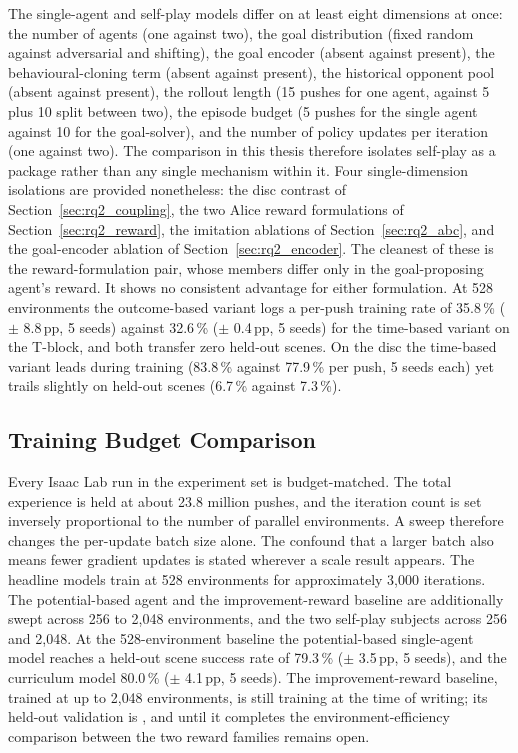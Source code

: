 The single-agent and self-play models differ on at least eight dimensions at once:
the number of agents (one against two), the goal distribution (fixed random
against adversarial and shifting), the goal encoder (absent against present), the
behavioural-cloning term (absent against present), the historical opponent pool
(absent against present), the rollout length (15 pushes for one agent, against
5 plus 10 split between two), the episode budget (5 pushes for the single agent
against 10 for the goal-solver), and the number of policy updates per iteration
(one
against two). The comparison in this thesis therefore isolates self-play as a
package rather than any single mechanism within it. Four single-dimension
isolations are provided nonetheless: the disc contrast of
Section~\ref{sec:rq2_coupling}, the two Alice reward formulations of
Section~\ref{sec:rq2_reward}, the imitation ablations of
Section~\ref{sec:rq2_abc}, and the goal-encoder ablation of
Section~\ref{sec:rq2_encoder}. The cleanest of these is the reward-formulation
pair, whose members differ only in the goal-proposing agent's reward. It shows no
consistent advantage for either formulation. At 528 environments the
outcome-based variant logs a per-push training rate of 35.8\,\%
($\pm$ 8.8\,pp, 5 seeds) against 32.6\,\% ($\pm$ 0.4\,pp, 5 seeds) for the
time-based variant on the T-block, and both transfer zero held-out scenes. On the
disc the time-based variant leads during training (83.8\,\% against 77.9\,\%
per push,
5 seeds each) yet trails slightly on held-out scenes (6.7\,\% against
7.3\,\%).

\subsection{Training Budget Comparison}
\label{app:budget}

Every Isaac Lab run in the experiment set is budget-matched. The total experience
is held at about 23.8 million pushes, and the iteration count is set inversely
proportional to the number of parallel environments. A sweep therefore changes
the per-update batch size alone. The confound that a larger batch also means
fewer gradient updates is stated wherever a scale result appears. The headline
models
train at 528 environments for approximately 3{,}000 iterations. The
potential-based agent and the improvement-reward baseline are additionally swept
across 256 to 2{,}048 environments, and the two self-play subjects across 256 and
2{,}048. At the 528-environment baseline the potential-based single-agent model
reaches a held-out scene success rate of 79.3\,\% ($\pm$ 3.5\,pp, 5 seeds), and
the curriculum model 80.0\,\% ($\pm$ 4.1\,pp, 5 seeds). The improvement-reward
baseline, trained at up to 2{,}048 environments, is still training at the time
of writing; its held-out validation is \TBD, and until it completes the
environment-efficiency comparison between the two reward families remains open.

